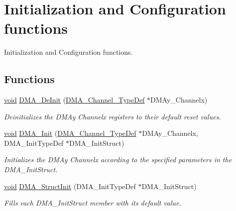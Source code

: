 \hypertarget{group___d_m_a___group1}{\section{Initialization and Configuration functions}
\label{group___d_m_a___group1}
}


Initialization and Configuration functions.  


\subsection*{Functions}
\begin{DoxyCompactItemize}
\item 
\hyperlink{group___n_a_m_e_ga18028b8badbf1ea7e704ccac3c488e82}{void} \hyperlink{group___d_m_a___group1_ga21ca0d50b13e502db5ab5feb484f9ece}{D\-M\-A\-\_\-\-De\-Init} (\hyperlink{struct_d_m_a___channel___type_def}{D\-M\-A\-\_\-\-Channel\-\_\-\-Type\-Def} $\ast$D\-M\-Ay\-\_\-\-Channelx)
\begin{DoxyCompactList}\small\item\em Deinitializes the D\-M\-Ay Channelx registers to their default reset values. \end{DoxyCompactList}\item 
\hyperlink{group___n_a_m_e_ga18028b8badbf1ea7e704ccac3c488e82}{void} \hyperlink{group___d_m_a___group1_ga7c3d1b9dc041f8e5f2cfc8d5dd858278}{D\-M\-A\-\_\-\-Init} (\hyperlink{struct_d_m_a___channel___type_def}{D\-M\-A\-\_\-\-Channel\-\_\-\-Type\-Def} $\ast$D\-M\-Ay\-\_\-\-Channelx, D\-M\-A\-\_\-\-Init\-Type\-Def $\ast$D\-M\-A\-\_\-\-Init\-Struct)
\begin{DoxyCompactList}\small\item\em Initializes the D\-M\-Ay Channelx according to the specified parameters in the D\-M\-A\-\_\-\-Init\-Struct. \end{DoxyCompactList}\item 
\hyperlink{group___n_a_m_e_ga18028b8badbf1ea7e704ccac3c488e82}{void} \hyperlink{group___d_m_a___group1_ga0f7f95f750a90a6824f4e9b6f58adc7e}{D\-M\-A\-\_\-\-Struct\-Init} (D\-M\-A\-\_\-\-Init\-Type\-Def $\ast$D\-M\-A\-\_\-\-Init\-Struct)
\begin{DoxyCompactList}\small\item\em Fills each D\-M\-A\-\_\-\-Init\-Struct member with its default value. \end{DoxyCompactList}\item 

\end{DoxyCompactItemize}
